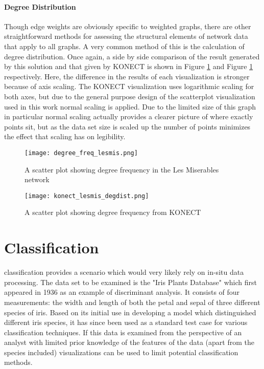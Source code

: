 \paragraph{Degree Distribution}
Though edge weights are obviously specific to weighted graphs, there are other straightforward methods for assessing the structural elements of network data that apply to all graphs. A very common method of this is the calculation of degree distribution. Once again, a side by side comparison of the result generated by this solution and that given by KONECT is shown in Figure \ref{fig:degfreqlesmis} and Figure \ref{fig:degfreqlesmis} respectively. Here, the difference in the results of each visualization is stronger because of axis scaling. The KONECT visualization uses logarithmic scaling for both axes, but due to the general purpose design of the scatterplot visualization used in this work normal scaling is applied. Due to the limited size of this graph in particular normal scaling actually provides a clearer picture of where exactly points sit, but as the data set size is scaled up the number of points minimizes the effect that scaling has on legibility. 

\begin{figure}
	\centering
		\centering
		\texttt{[image: degree\_freq\_lesmis.png]}
		\caption{A scatter plot showing degree frequency in the Les Miserables network}
		\label{fig:degfreqlesmis}
\end{figure}
\begin{figure}
	\centering
		\texttt{[image: konect\_lesmis\_degdist.png]}
		\caption{A scatter plot showing degree frequency from KONECT}
		\label{fig:degfreqkonect}
\end{figure}

\section{Classification}
\label{sec:classification}
 classification provides a scenario which would very likely rely on in-situ data processing. The data set to be examined is the "Iris Plants Database" \cite{Fisher1936} which first appeared in 1936 as an example of discriminant analysis. It consists of four measurements: the width and length of both the petal and sepal of three different species of iris. Based on its initial use in developing a model which distinguished different iris species, it has since been used as a standard test case for various classification techniques. If this data is examined from the perspective of an analyst with limited prior knowledge of the features of the data (apart from the species included) visualizations can be used to limit potential classification methods. 

